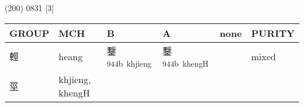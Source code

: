 \documentclass[14pt,a4paper]{scrartcl}
\begin{document}
(200) 0831 {[}3{]}

\begin{longtable}[c]{@{}llllll@{}}
\toprule
\begin{minipage}[b]{0.14\columnwidth}\raggedright\strut
GROUP
\strut\end{minipage} &
\begin{minipage}[b]{0.14\columnwidth}\raggedright\strut
MCH
\strut\end{minipage} &
\begin{minipage}[b]{0.14\columnwidth}\raggedright\strut
B
\strut\end{minipage} &
\begin{minipage}[b]{0.14\columnwidth}\raggedright\strut
A
\strut\end{minipage} &
\begin{minipage}[b]{0.14\columnwidth}\raggedright\strut
none
\strut\end{minipage} &
\begin{minipage}[b]{0.14\columnwidth}\raggedright\strut
PURITY
\strut\end{minipage}\tabularnewline
\midrule
\endhead
\begin{minipage}[t]{0.14\columnwidth}\raggedright\strut
輕
\strut\end{minipage} &
\begin{minipage}[t]{0.14\columnwidth}\raggedright\strut
heang
\strut\end{minipage} &
\begin{minipage}[t]{0.14\columnwidth}\raggedright\strut
鑋\textsuperscript{944b~khjieng}
\strut\end{minipage} &
\begin{minipage}[t]{0.14\columnwidth}\raggedright\strut
鑋\textsuperscript{944b~khengH}
\strut\end{minipage} &
\begin{minipage}[t]{0.14\columnwidth}\raggedright\strut
\strut\end{minipage} &
\begin{minipage}[t]{0.14\columnwidth}\raggedright\strut
mixed
\strut\end{minipage}\tabularnewline
\begin{minipage}[t]{0.14\columnwidth}\raggedright\strut
巠
\strut\end{minipage} &
\begin{minipage}[t]{0.14\columnwidth}\raggedright\strut
khjieng, khengH
\strut\end{minipage} &
\begin{minipage}[t]{0.14\columnwidth}\raggedright\strut

\end{minipage}
\end{longtable}
\end{document}
